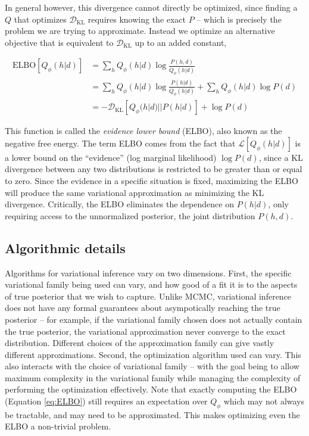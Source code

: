 In general however, this divergence cannot directly be optimized, since finding a $Q$ that optimizes $\mathcal{D}_{\text{KL}}$ requires knowing the exact $P$ -- which is precisely the problem we are trying to approximate. Instead we optimize an alternative objective that is equivalent to $\mathcal{D}_{\text{KL}}$ up to an added constant,

\begin{align}
\text{ELBO}[Q_\phi(h|d)] &=  \sum_h Q_\phi(h|d) \log \frac{P(h,d)}{Q_\phi(h|d)}  \nonumber \\
& = \sum_h Q_\phi(h|d) \log \frac{P(h|d)}{Q_\phi(h|d)} + \sum_h Q_\phi(h|d) \log P(d)  \nonumber \\
& = - \mathcal{D}_{\text{KL}}[Q_\phi(h|d)||P(h|d)]  + \log P(d)
\label{eq:ELBO}
\end{align}

This function is called the \emph{evidence lower bound} (ELBO), also known as the negative free energy. The term ELBO comes from the fact that $\mathcal{L}[Q_\phi(h|d)]$ is a lower bound on the ``evidence'' (log marginal likelihood) $\log P(d)$, since a KL divergence between any two distributions is restricted to be greater than or equal to zero. Since the evidence in a specific situation is fixed, maximizing the ELBO will produce the same variational approximation as minimizing the KL divergence. Critically, the ELBO eliminates the dependence on $P(h|d)$, only requiring access to the unnormalized posterior, the joint distribution $P(h,d)$.


\subsection{Algorithmic details}
\label{sec:var_alg}

Algorithms for variational inference vary on two dimensions. First, the specific variational family being used can vary, and how good of a fit it is to the aspects of true posterior that we wish to capture. Unlike MCMC, variational inference does not have any formal guarantees about asympotically reaching the true posterior -- for example, if the variational family chosen does not actually contain the true posterior, the variational approximation never converge to the exact distribution. Different choices of the approximation family can give vastly different approximations. Second, the optimization algorithm used can vary. This also interacts with the choice of variational family -- with the goal being to allow maximum complexity in the variational family while managing the complexity of performing the optimization effectively. Note that exactly computing the ELBO (Equation \ref{eq:ELBO}) still requires an expectation over $Q_\phi$ which may not always be tractable, and may need to be approximated. This makes optimizing even the ELBO a non-trivial problem.

